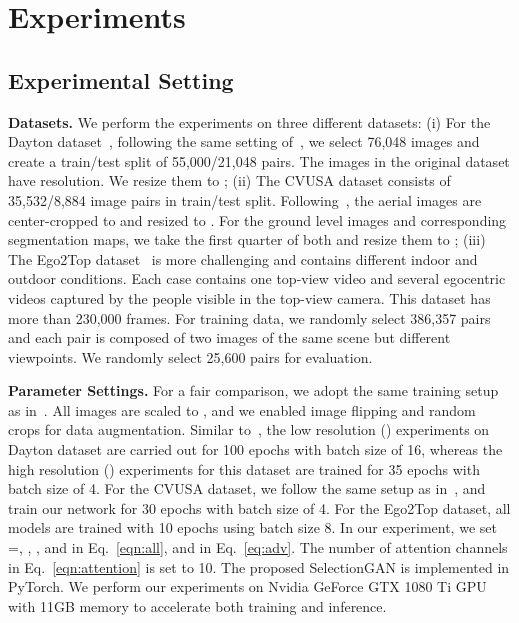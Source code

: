 \documentclass[10pt,twocolumn,letterpaper]{article}
\begin{document}
\section{Experiments}
\vspace{-0.1cm}
\label{sec:experiments}
\subsection{Experimental Setting}
\vspace{-0.2cm}
\noindent \textbf{Datasets.}
We perform the experiments on three different datasets: (i) For the Dayton dataset~\cite{vo2016localizing}, following the same setting of~\cite{regmi2018cross}, we select 76,048 images and create a train/test split of 55,000/21,048 pairs. 
The images in the original dataset have  resolution. 
We resize them to ; (ii) The CVUSA dataset \cite{workman2015wide} consists of 35,532/8,884 image pairs in train/test split. 
Following~\cite{zhai2017predicting,regmi2018cross}, the aerial images are center-cropped to  and resized to . 
For the ground level images and corresponding segmentation maps, we take the first quarter of both and resize them to ; (iii) The Ego2Top dataset~\cite{ardeshir2016ego2top} is more challenging and contains different indoor and outdoor conditions.
Each case contains one top-view video and several egocentric videos captured by the people visible in the top-view camera. This dataset has more than 230,000 frames. For training data, we randomly select 386,357 pairs and each pair is composed of two images of the same scene but different viewpoints.
We randomly select 25,600 pairs for evaluation.


\noindent \textbf{Parameter Settings.}
For a fair comparison, we adopt the same training setup as in~\cite{isola2017image,regmi2018cross}. All images are scaled to , and we enabled image flipping and random crops for data augmentation.
Similar to~\cite{regmi2018cross}, the low resolution () experiments on Dayton dataset are carried out for 100 epochs with batch size of 16, whereas the high resolution () experiments for this dataset are trained for 35 epochs with batch size of 4.
For the CVUSA dataset, we follow the same setup as in~\cite{zhai2017predicting,regmi2018cross}, and train our network for 30 epochs with batch size of 4.
For the Ego2Top dataset, all models are trained with 10 epochs using batch size 8. In our experiment, we set =, , ,  and  in Eq.~\eqref{eqn:all}, and  in Eq.~\eqref{eq:adv}.
The number of attention channels  in Eq.~\eqref{eqn:attention} is set to 10.
The proposed SelectionGAN is implemented in PyTorch.
We perform our experiments on Nvidia GeForce GTX 1080 Ti GPU with 11GB memory to accelerate both training and inference.
\end{document}
